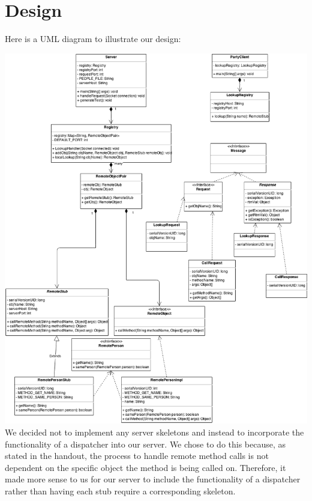 \documentclass[12pt]{article}
\begin{document}
\maketitle

\pagebreak
\section{Design}

Here is a UML diagram to illustrate our design:

\includegraphics[scale=.44]{UMLsized.png} \\

We decided not to implement any server skeletons and instead to incorporate the functionality of a dispatcher into our server. We chose to do this because, as stated in the handout, the process to handle remote method calls is not dependent on the specific object the method is being called on. Therefore, it made more sense to us for our server to include the functionality of a dispatcher rather than having each stub require a corresponding skeleton.
\end{document}

